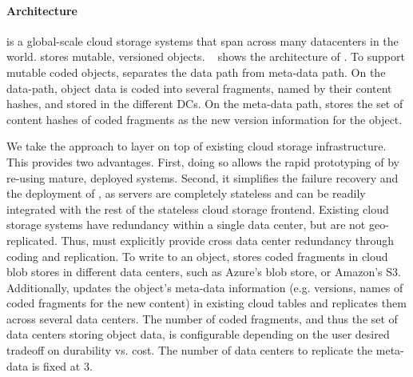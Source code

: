 \paragraph{Architecture}
{\name} is a global-scale cloud storage systems that span across many
datacenters in the world.  \name stores mutable, versioned objects.
~ shows the architecture of \name.  To support mutable coded
objects, \name separates the data path from meta-data path.  On the data-path,
object data is coded into several fragments, named by their content hashes, and
stored in the different DCs.   On the meta-data path, \name stores the set of
content hashes of coded fragments as the new version information for the object.

We take the approach to layer \name on top of existing cloud storage infrastructure. This 
provides two advantages.  First, doing so allows the rapid prototyping of \name by re-using 
mature, deployed systems.  Second, it simplifies the failure recovery and 
the deployment of \name, as \name servers are completely stateless and can be
readily integrated with the rest of the stateless cloud storage frontend.
Existing cloud storage systems have redundancy within a single data center, but
are not geo-replicated.  Thus, \name must explicitly provide cross data center
redundancy through coding and replication.  To write to an object, {\name}
stores coded fragments in cloud blob stores in different data centers, such as
Azure's blob store, or Amazon's S3.  Additionally, \name updates the object's
meta-data information (e.g.  versions, names of coded fragments for the new
content) in existing cloud tables and replicates them across several data
centers.  The number of coded fragments, and thus the set of data centers
storing object data, is configurable depending on the user desired tradeoff on
durability vs. cost.  The number of data centers to replicate the meta-data is
fixed at 3.

%


